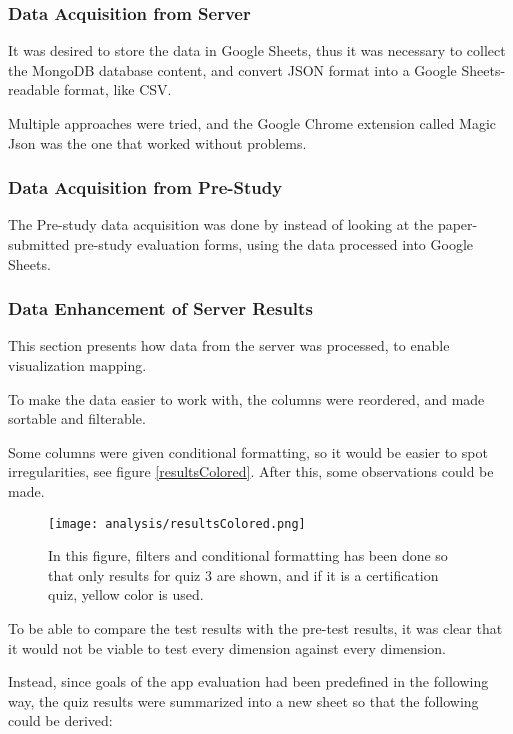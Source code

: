 \subsubsection{Data Acquisition from Server}

It was desired to store the data in Google Sheets, thus it was necessary to collect the MongoDB database content, and convert JSON format into a Google Sheets-readable format, like CSV.

Multiple approaches were tried, and the Google Chrome extension called Magic Json \citep{agaze} was the one that worked without problems.

\subsubsection{Data Acquisition from Pre-Study}

The Pre-study data acquisition was done by instead of looking at the paper-submitted pre-study evaluation forms, using the data processed into Google Sheets.

\subsubsection{Data Enhancement of Server Results}

This section presents how data from the server was processed, to enable visualization mapping.

To make the data easier to work with, the columns were reordered, and made sortable and filterable.

Some columns were given conditional formatting, so it would be easier to spot irregularities, see figure \ref{resultsColored}. After this, some observations could be made.

\begin{figure}[h]
    \centering
    \texttt{[image: analysis/resultsColored.png]}
    \caption{In this figure, filters and conditional formatting has been done so that only results for quiz 3 are shown, and if it is a certification quiz, yellow color is used.}
    \label{fig:resultsColored}
\end{figure}

To be able to compare the test results with the pre-test results, it was clear that it would not be viable to test every dimension against every dimension.

Instead, since goals of the app evaluation had been predefined in the following way, the quiz results were summarized into a new sheet so that the following could be derived:

